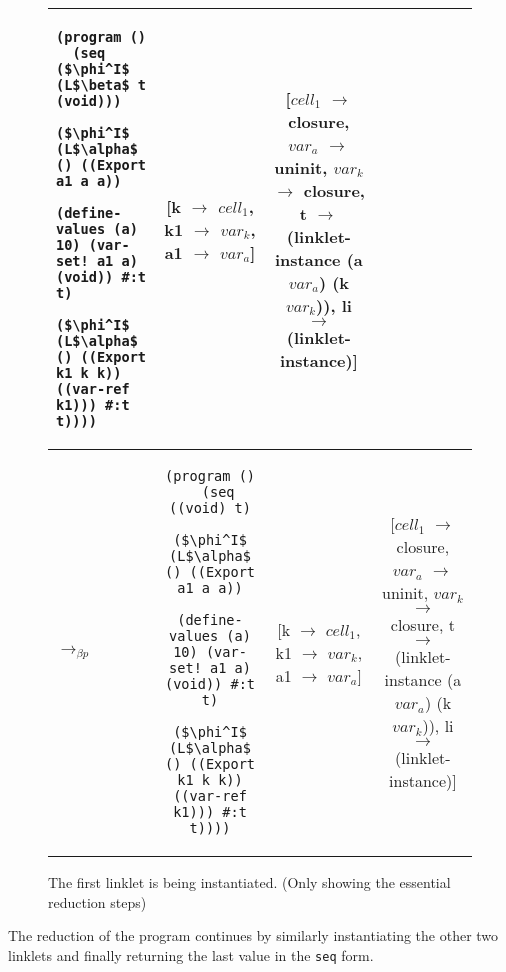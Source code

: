 \begin{figure}[h!]
\begin{tabular}{lc|c|c}
\begin{lstlisting}[mathescape]
(program ()
  (seq ($\phi^I$ (L$\beta$ t (void)))
        ($\phi^I$ (L$\alpha$ () ((Export a1 a a))
                (define-values (a) 10) (var-set! a1 a) (void)) #:t t)
        ($\phi^I$ (L$\alpha$ () ((Export k1 k k)) ((var-ref k1))) #:t t))))
    \end{lstlisting} & \thead{[k $\rightarrow$ $cell_1$,\\k1 $\rightarrow$ $var_k$,\\a1 $\rightarrow$ $var_a$]} & \thead{[$cell_1$ $\rightarrow$ closure,\\$var_a$ $\rightarrow$ uninit,\\$var_k$ $\rightarrow$ closure,\\t $\rightarrow$ (linklet-instance\\(a $var_a$) (k $var_k$)),\\li $\rightarrow$ (linklet-instance)]} \\ \hline
    $\longrightarrow_{\beta p}$&\begin{lstlisting}[mathescape]
(program ()
  (seq ((void) t)
        ($\phi^I$ (L$\alpha$ () ((Export a1 a a))
                (define-values (a) 10) (var-set! a1 a) (void)) #:t t)
        ($\phi^I$ (L$\alpha$ () ((Export k1 k k)) ((var-ref k1))) #:t t))))
    \end{lstlisting} & \thead{[k $\rightarrow$ $cell_1$,\\k1 $\rightarrow$ $var_k$,\\a1 $\rightarrow$ $var_a$]} & \thead{[$cell_1$ $\rightarrow$ closure,\\$var_a$ $\rightarrow$ uninit,\\$var_k$ $\rightarrow$ closure,\\t $\rightarrow$ (linklet-instance\\(a $var_a$) (k $var_k$)),\\li $\rightarrow$ (linklet-instance)]} \\ \hline
  \end{tabular}
  \caption{The first linklet is being instantiated. (Only showing the essential reduction steps)}
\end{figure}

The reduction of the program continues by similarly instantiating the
other two linklets and finally returning the last value in the
\verb|seq| form.

